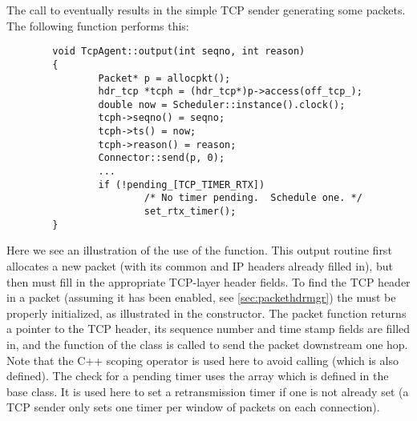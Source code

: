 The call to  eventually results in the simple TCP sender
generating some packets.  The following function 
performs this:
\begin{small}
\begin{verbatim}
        void TcpAgent::output(int seqno, int reason)
        {
                Packet* p = allocpkt();
                hdr_tcp *tcph = (hdr_tcp*)p->access(off_tcp_);
                double now = Scheduler::instance().clock();
                tcph->seqno() = seqno;
                tcph->ts() = now;
                tcph->reason() = reason;
                Connector::send(p, 0);
                ...
                if (!pending_[TCP_TIMER_RTX])
                        /* No timer pending.  Schedule one. */
                        set_rtx_timer();
        }
\end{verbatim}
\end{small}
Here we see an illustration of the use of the 
function.
This output routine first allocates a new packet
(with its common and IP headers already filled in), but then must fill
in the appropriate TCP-layer header fields.
To find the TCP header in a packet (assuming it has been enabled, see
\ref{sec:packethdrmgr}) the  must be properly initialized,
as illustrated in the constructor.
The packet  function returns a pointer to the TCP
header, its sequence number and time stamp fields are filled in,
and the  function of the  class is called
to send the packet downstream one hop.
Note that the C++ \code{::} scoping operator is used here to avoid
calling  (which is also defined).
The check for a pending timer uses the array  which
is defined in the  base class.
It is used here to set a retransmission timer if one is not already set
(a TCP sender only sets one timer per window of packets on each connection).

\subsubsection{}

